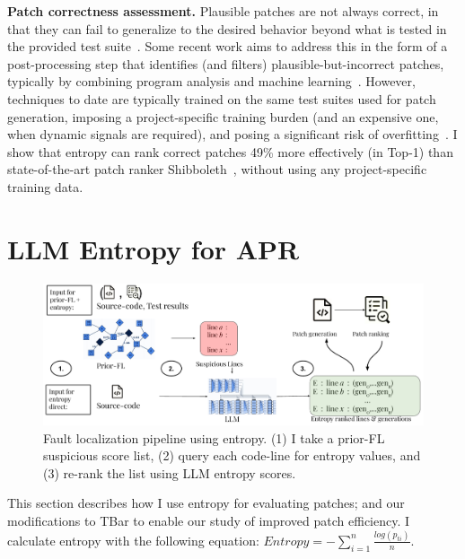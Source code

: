 \documentclass[12pt,openany,oneside,table]{cmuthesis}
\begin{document}
\vspace{1ex} 
\noindent\textbf{Patch correctness assessment.}
Plausible patches are not always correct, in that they can fail to generalize to
the desired behavior beyond what is tested in the provided test 
suite~\cite{CURE}.  Some recent work aims to address this in the form of a 
post-processing step that identifies (and filters) plausible-but-incorrect
patches, typically by combining program analysis and machine
learning~\cite{Panther, Shibboleth, yang2023large}.  However, techniques to date
are typically trained on the same test suites used for patch generation,
imposing a project-specific training burden (and an expensive one, when dynamic
signals are required), and posing a significant risk of overfitting~\cite{CURE, yang2023large}.  
I show that entropy can rank correct patches 49\% more effectively (in Top-1) than state-of-the-art patch ranker Shibboleth~\cite{Shibboleth}, without using any project-specific training data.

\section{LLM Entropy for APR}
\begin{figure}[t]
\centering
\includegraphics[width=\textwidth]{figures/approach/entropy_approach.pdf}
\caption{Fault localization pipeline using entropy. (1) I take a prior-FL suspicious score list, (2) query each code-line for entropy values, and (3) re-rank the list using LLM entropy scores.}
\label{fig:fl-method}
\end{figure}


This section describes how I use entropy for evaluating patches; and our modifications to TBar to enable our
 study of improved patch efficiency.
I calculate entropy with the following equation:
$Entropy = -\sum_{i=1}^{n}\frac{log(p_{ti})}{n}$.
\end{document}
